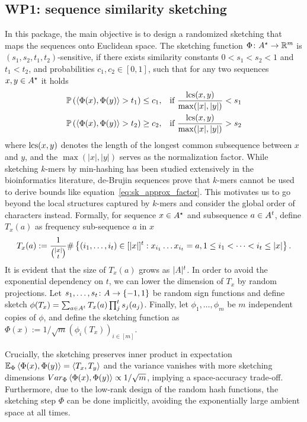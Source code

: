 

\subsection{WP1: sequence similarity sketching}
In this package, the main objective is to design a randomized sketching that maps the sequences onto Euclidean space. 
The sketching function $\Phi\colon A^\star\to \mathbb{R}^m$ is $(s_1,s_2, t_1,t_2)$-sensitive, if there exists similarity constants $0<s_1 < s_2<1$ and $t_1 < t_2$, and probabilities $c_1,c_2\in[0,1]$, such that for any two sequences $x,y\in A^\star$ it holds 
\begin{align}
\label{eq:sk_approx_factor}
\mathbb{P}\left( \left\langle \Phi(x), \Phi(y) \right\rangle > t_1  \right)\le c_1, && \text{if } \frac{\operatorname{\mathrm{lcs}}(x,y)}{\max(|x|,|y|)}< s_1  \\
\mathbb{P}\left( \left\langle \Phi(x), \Phi(y) \right\rangle > t_2  \right)\ge c_2, && \text{if } \frac{\operatorname{\mathrm{lcs}}(x,y)}{\max(|x|,|y|)}>s_2
\end{align}
where $\operatorname{\mathrm{lcs}}(x,y)$ denotes the length of the longest common subsequence between $x$ and $y$, and the $\max(|x|,|y|)$ serves as the normalization factor.
While sketching $k$-mers by min-hashing has been studied extensively in the bioinformatics literature, de-Brujin sequences prove that $k$-mers cannot be used to derive bounds like equation~\eqref{eq:sk_approx_factor}. This motivates us to go beyond the local structures captured by $k$-mers and consider the global order of characters instead. Formally, for sequence $x\in A^\star$ and subsequence $a\in A^t$, define $T_x(a)$ as frequency sub-sequence $a$ in $x$ 
\begin{align}
 T_x(a):=\frac{1}{\binom{|x|}{t}}\# \left\{(i_1,\dots,i_t)\in[|x|]^t: x_{i_1}\dots x_{i_t}=a, 1\le i_1<\dots<i_t\le |x|\right\}.
\end{align}
It is evident that the size of $T_x(a)$ grows as $| A|^t$. In order to avoid the exponential dependency on $t$, we can lower the dimension of $T_x$ by random projections. Let $s_1,\dots, s_t\colon A\to \left\{-1,1\right\}$ be random sign functions and define sketch $\phi(T_x)=\sum_{a\in A^t} T_x(a)\prod_j^t s_j(a_j)$. Finally, let $\phi_1, \dots, \phi_m$ be $m$ independent copies of $\phi$, and define the sketching function as $\Phi(x):=1/\sqrt{m}(\phi_i(T_x))_{i\in[m]}$. 

Crucially, the sketching preserves inner product in expectation $\mathbb{E}_\Phi \left\langle \Phi(x), \Phi(y) \right\rangle = \left\langle T_x, T_y \right\rangle$ and the variance vanishes with more sketching dimensions $Var_\Phi \left\langle \Phi(x), \Phi(y) \right\rangle\propto 1/\sqrt{m}$, implying a space-accuracy trade-off. Furthermore, due to the low-rank design of the random hash functions, the sketching step $\Phi$ can be done implicitly, avoiding the exponentially large ambient space at all times. 

